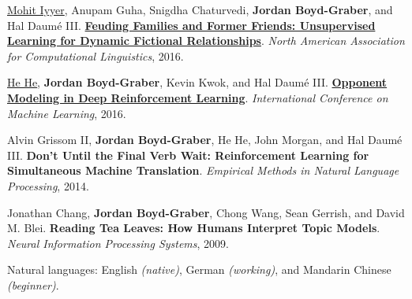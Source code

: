 \documentclass[10pt,a4paper]{article} %
\begin{document}
\begin{multicols}{2}
\begin{enumerate*}
\item \underline{Mohit Iyyer}, Anupam Guha, Snigdha Chaturvedi, {\bf Jordan Boyd-Graber}, and Hal {Daum\'{e} III}.  {\bf \href{http://cs.colorado.edu/~jbg//docs/2016_naacl_relationships.pdf}{Feuding Families and Former Friends: Unsupervised Learning for Dynamic Fictional Relationships}}.  \emph{North American Association for Computational Linguistics}, 2016.

	 \item \underline{\href{http://www.umiacs.umd.edu/~hhe/}{He He}}, {\bf Jordan Boyd-Graber}, Kevin Kwok, and Hal {Daum\'{e} III}.  {\bf \href{http://umiacs.umd.edu/~jbg//docs/2016_icml_opponent.pdf}{Opponent Modeling in Deep Reinforcement Learning}}.  \emph{International Conference on Machine Learning}, 2016.

\item Alvin {Grissom II}, {\bf Jordan Boyd-Graber}, He He, John Morgan, and Hal {Daum\'{e} III}.  {\bf Don't Until the Final Verb Wait: Reinforcement Learning for Simultaneous Machine Translation}.  \emph{Empirical Methods in Natural Language Processing}, 2014.


\item Jonathan Chang, {\bf Jordan Boyd-Graber}, Chong Wang, Sean Gerrish,
and David M. Blei.  {\bf Reading Tea Leaves: How Humans Interpret
  Topic Models}.  \emph{Neural Information Processing Systems}, 2009.



\end{enumerate*}

\end{multicols}

\spacedhrule{1.6em}{-0.4em} %


\inlineheadsection %
{Natural languages:}
{English \textit{(native)}, German \textit{(working)}, and Mandarin Chinese \textit{(beginner)}.}

\end{document}
